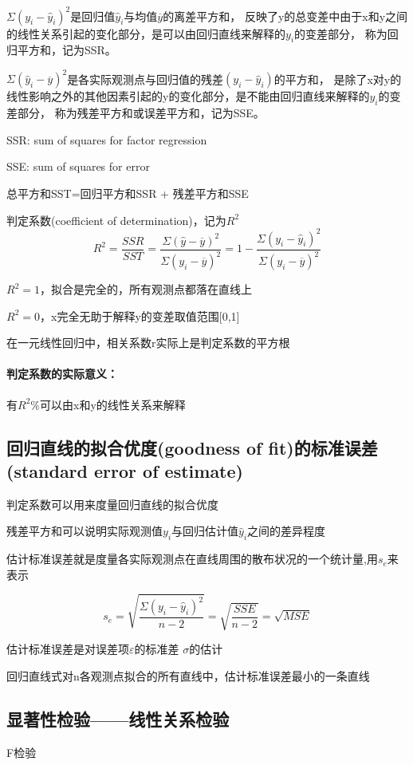 \documentclass[UTF8,10pt]{book}
\begin{document}
$\Sigma (y_i-\hat{y}_i)^2$是回归值$\hat{y}_i$与均值$\overline{y}$的离差平方和，
反映了y的总变差中由于x和y之间的线性关系引起的变化部分，是可以由回归直线来解释的$y_i$的变差部分，
称为回归平方和，记为SSR。

$\Sigma(\hat{y}_i-\overline{y})^2 $是各实际观测点与回归值的残差$(y_i-\hat{y}_i)$的平方和，
是除了x对y的线性影响之外的其他因素引起的y的变化部分，是不能由回归直线来解释的$y_i$的变差部分，
称为残差平方和或误差平方和，记为SSE。

SSR: sum of squares for factor regression

SSE: sum of squares for error 

总平方和SST=回归平方和SSR + 残差平方和SSE 

判定系数(coefficient of determination)，记为$R^2$ 
$$R^2 = \frac{SSR}{SST}=\frac{\Sigma(\hat{y}-\overline{y})^2}{\Sigma(y_i-\overline{y})^2} = 1 - \frac{\Sigma(y_i - \hat{y}_i)^2}{\Sigma(y_i-\overline{y})^2}$$ 

$R^2=1$，拟合是完全的，所有观测点都落在直线上

$R^2=0$，x完全无助于解释y的变差取值范围[0,1] 

在一元线性回归中，相关系数r实际上是判定系数的平方根 

\paragraph{判定系数的实际意义：}有$R^2\%$可以由x和y的线性关系来解释

\subsection{回归直线的拟合优度(goodness of fit)的标准误差(standard error of estimate)}	

判定系数可以用来度量回归直线的拟合优度 

残差平方和可以说明实际观测值$y_i$与回归估计值$\hat{y}_i$之间的差异程度 

估计标准误差就是度量各实际观测点在直线周围的散布状况的一个统计量,用$s_e$来表示 

$$ s_e = \sqrt{\frac{\Sigma (y_i - \hat{y}_i)^2}{n-2}} = \sqrt{\frac{SSE}{n-2}}=\sqrt{MSE} $$ 

估计标准误差是对误差项$\varepsilon$的标准差 $\sigma$的估计 

回归直线式对n各观测点拟合的所有直线中，估计标准误差最小的一条直线

\subsection{显著性检验——线性关系检验}	
F检验
\end{document}
